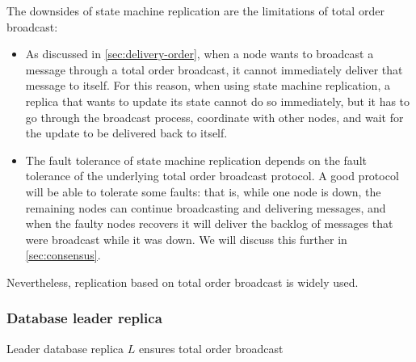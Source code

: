 The downsides of state machine replication are the limitations of total order broadcast:
\begin{itemize}
    \item As discussed in \autoref{sec:delivery-order}, when a node wants to broadcast a message through a total order broadcast, it cannot immediately deliver that message to itself.
        For this reason, when using state machine replication, a replica that wants to update its state cannot do so immediately, but it has to go through the broadcast process, coordinate with other nodes, and wait for the update to be delivered back to itself.
    \item The fault tolerance of state machine replication depends on the fault tolerance of the underlying total order broadcast protocol.
        A good protocol will be able to tolerate some faults: that is, while one node is down, the remaining nodes can continue broadcasting and delivering messages, and when the faulty nodes recovers it will deliver the backlog of messages that were broadcast while it was down.
        We will discuss this further in \autoref{sec:consensus}.
\end{itemize}
Nevertheless, replication based on total order broadcast is widely used.

\begin{frame}
    \label{s:leader-database}
    \frametitle{Database leader replica}
    Leader database replica $L$ ensures total order broadcast
    \begin{center}
    \end{center}%
\end{frame}
\label{l:leader-database}

